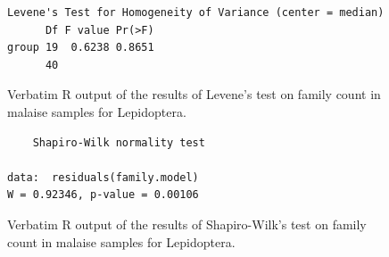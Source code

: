 \documentclass[10pt,letterpaper,twocolumn]{article}
\begin{document}
\begin{figure}[h]
	\lstset{numbers=left}
	\lstset{xleftmargin=5mm,framexleftmargin=5mm}
	\begin{lstlisting}
Levene's Test for Homogeneity of Variance (center = median)
      Df F value Pr(>F)
group 19  0.6238 0.8651
      40               
	\end{lstlisting}
	\caption{Verbatim R output of the results of Levene's test on family count in malaise samples for Lepidoptera.}
	\label{fig:malaise_lepidoptera_family_levene}
	\smallskip
	\nointerlineskip
	\hrulefill
\end{figure}

\begin{figure}[h]
	\lstset{numbers=left}
	\lstset{xleftmargin=5mm,framexleftmargin=5mm}
	\begin{lstlisting}
	Shapiro-Wilk normality test

data:  residuals(family.model)
W = 0.92346, p-value = 0.00106
	\end{lstlisting}
	\caption{Verbatim R output of the results of Shapiro-Wilk's test on family count in malaise samples for Lepidoptera.}
	\label{fig:malaise_lepidoptera_family_shapiro}
	\smallskip
	\nointerlineskip
	\hrulefill
\end{figure}
\end{document}
